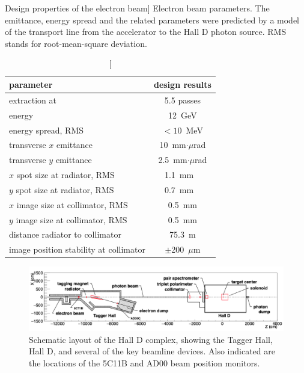 \begin{table}[tbp]
\begin{center}
\caption
[Design properties of the electron beam]
{Electron beam parameters. The emittance, energy spread and
the related parameters were
predicted by a model of the transport line from
the accelerator to the Hall D photon source. RMS stands for root-mean-square deviation.}
\label{tab:elecprop}
\begin{tabular}{|l|c|}
\hline\hline
parameter & design results \\
\hline
extraction at & 5.5 passes \\
energy & 12~GeV \\
energy spread, RMS & $<10$~MeV \\
transverse $x$ emittance & 10~mm$\cdot\mu$rad \\
transverse $y$ emittance & 2.5~mm$\cdot\mu$rad \\
$x$ spot size at radiator, RMS & 1.1~mm \ \\
$y$ spot size at radiator, RMS & 0.7~mm \ \\
$x$ image size at collimator, RMS & 0.5~mm \\
$y$ image size at collimator, RMS & 0.5~mm \\
distance radiator to collimator & 75.3~m \\
image position stability at collimator & $\pm$200~$\mu$m \\
\hline\hline
\end{tabular}
\end{center}
\end{table}



\begin{figure}[t]
\begin{center}
 \includegraphics[clip=true,width=0.98\linewidth]{figures/Draw_beamline.png}
\end{center}
\caption{Schematic layout of the Hall D complex, showing the Tagger Hall, Hall D, and several of the key beamline devices. Also indicated are the locations of the 5C11B and AD00 beam position monitors.
        }
\label{fig:beam:Draw_beamline} 
\end{figure}

